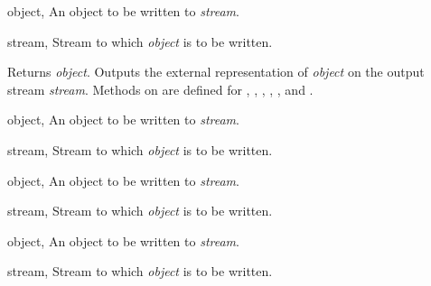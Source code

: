 \begin{optDefinition}
\begin{genericargs}
    \item[object, \classref{object}] An object to be written to {\em stream}.
    \item[stream, \classref{stream}] Stream to which {\em object\/} is to be
    written.
\end{genericargs}
%
\result%
Returns {\em object}.
%
\remarks%
Outputs the external representation of {\em object\/} on the output stream
{\em stream}.
%
\seealso%
Methods on  are defined for ,
, , ,
,  and .

\begin{specargs}
    \item[object, \classref{object}] An object to be written to {\em stream}.
    \item[stream, \classref{stream}] Stream to which {\em object\/} is to be
    written.
\end{specargs}

\begin{specargs}
    \item[object, \classref{object}] An object to be written to {\em stream}.
    \item[stream, \classref{buffered-stream}] Stream to which {\em object\/} is
    to be written.
\end{specargs}

\begin{specargs}
    \item[object, \classref{object}] An object to be written to {\em stream}.
    \item[stream, \classref{file-stream}] Stream to which {\em object\/} is
    to be written.
\end{specargs}


\end{optDefinition}
